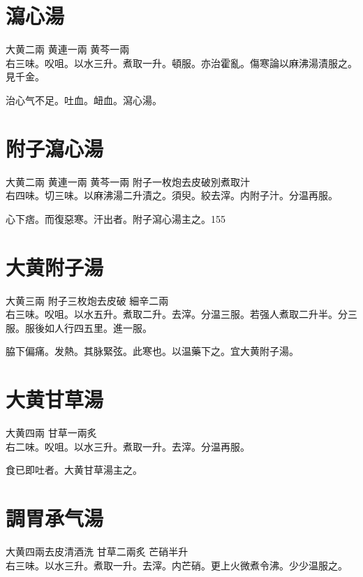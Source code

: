 \section{瀉心湯}

大黄{\scriptsize 二兩} 黄連{\scriptsize 一兩} 黄芩{\scriptsize 一兩}\\
右三味。㕮咀。以水三升。煮取一升。頓服。亦治霍亂。{\scriptsize 傷寒論以麻沸湯漬服之。見千金。}

治心气不足。吐血。衄血。瀉心湯。

\section{附子瀉心湯}

大黄{\scriptsize 二兩} 黄連{\scriptsize 一兩} 黄芩{\scriptsize 一兩} 附子{\scriptsize 一枚炮去皮破別煮取汁}\\
右四味。切三味。以麻沸湯二升漬之。須臾。絞去滓。内附子汁。分温再服。

心下痞。而復惡寒。汗出者。附子瀉心湯主之。155

\section{大黄附子湯}

大黄{\scriptsize 三兩} 附子{\scriptsize 三枚炮去皮破} 細辛{\scriptsize 二兩}\\
右三味。㕮咀。以水五升。煮取二升。去滓。分温三服。若强人煮取二升半。分三服。服後如人行四五里。進一服。

脇下偏痛。发熱。其脉緊弦。此寒也。以温藥下之。宜大黄附子湯。

\section{大黄甘草湯}

大黄{\scriptsize 四兩} 甘草{\scriptsize 一兩炙}\\
右二味。㕮咀。以水三升。煮取一升。去滓。分温再服。

食已即吐者。大黄甘草湯主之。

\section{調胃承气湯}

大黄{\scriptsize 四兩去皮清酒洗} 甘草{\scriptsize 二兩炙} 芒硝{\scriptsize 半升}\\
右三味。以水三升。煮取一升。去滓。内芒硝。更上火微煮令沸。少少温服之。

